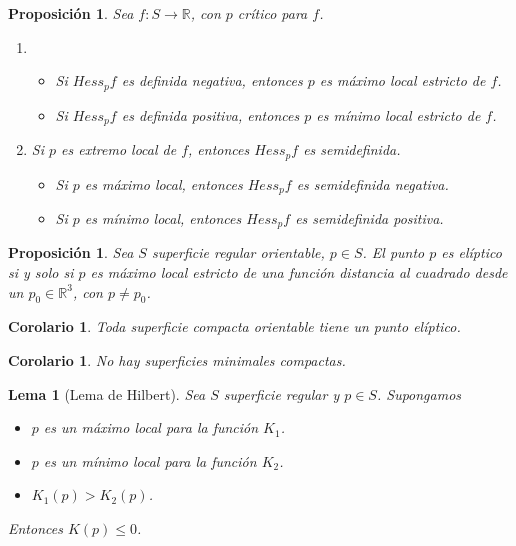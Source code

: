 \documentclass{report}
\newtheorem{corollary}[theorem]{Corolario}
\newtheorem{lemma}[theorem]{Lema}
\newtheorem{proposition}[theorem]{Proposición}
\theoremstyle{remark}
\theoremstyle{remark}
\theoremstyle{definition}
\theoremstyle{definition}
\theoremstyle{definition}
\begin{document}
\begin{proposition}
    Sea $f : S \to \mathbb{R}$, con $p$ crítico para $f$.
    \begin{enumerate}
        \item \begin{itemize}
                  \item Si $Hess_pf$ es definida negativa, entonces $p$ es máximo local estricto de $f$.
                  \item Si $Hess_pf$ es definida positiva, entonces $p$ es mínimo local estricto de $f$.
              \end{itemize}
        \item Si $p$ es extremo local de $f$, entonces $Hess_pf$ es semidefinida.
              \begin{itemize}
                  \item Si $p$ es máximo local, entonces $Hess_pf$ es semidefinida negativa.
                  \item Si $p$ es mínimo local, entonces $Hess_pf$ es semidefinida positiva.
              \end{itemize}
    \end{enumerate}
\end{proposition}

\begin{proposition}
    Sea $S$ superficie regular orientable, $p \in S$.
    El punto $p$ es elíptico si y solo si $p$ es máximo local estricto de una función distancia al cuadrado desde un $p_0 \in \mathbb{R}^3$, con $p \neq p_0$.
\end{proposition}

\begin{corollary}
    Toda superficie compacta orientable tiene un punto elíptico.
\end{corollary}

\begin{corollary}
    No hay superficies minimales compactas.
\end{corollary}

\begin{lemma}[Lema de Hilbert]
    Sea $S$ superficie regular y $p \in S$. Supongamos
    \begin{itemize}
        \item $p$ es un máximo local para la función $K_1$.
        \item $p$ es un mínimo local para la función $K_2$.
        \item $K_1(p) > K_2(p)$.
    \end{itemize}
    Entonces $K(p) \leq 0$.
\end{lemma}
\end{document}
